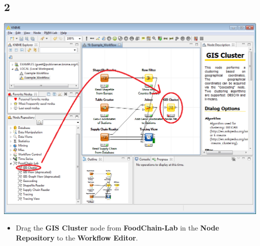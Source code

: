 \documentclass{beamer}
\begin{document}
\subsection{2}
\begin{frame}
	\begin{center}
  		\includegraphics[height=0.6\textheight]{2.png}
	\end{center}
	\begin{itemize}
		\item Drag the \textbf{GIS Cluster} node from \textbf{FoodChain-Lab} in the \textbf{Node Repository} to the \textbf{Workflow Editor}.
	\end{itemize}
\end{frame}
\end{document}
